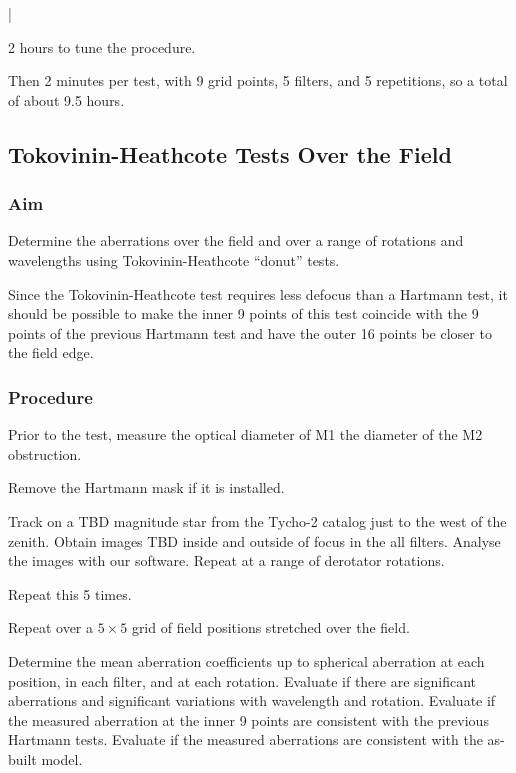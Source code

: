 |\documentclass{article}
\begin{document}
2 hours to tune the procedure.

Then 2 minutes per test, with 9 grid points, 5 filters, and 5 repetitions, so a total of about 9.5 hours.


\subsection{Tokovinin-Heathcote Tests Over the Field}

\subsubsection{Aim}

Determine the aberrations over the field and over a range of rotations and wavelengths using Tokovinin-Heathcote “donut” tests.

Since the Tokovinin-Heathcote test requires less defocus than a Hartmann test, it should be possible to make the inner 9 points of this test coincide with the 9 points of the previous Hartmann test and have the outer 16 points be closer to the field edge.

\subsubsection{Procedure}

Prior to the test, measure the optical diameter of M1 the diameter of the M2 obstruction.

Remove the Hartmann mask if it is installed.

Track on a TBD magnitude star from the Tycho-2 catalog just to the west of the zenith. Obtain images TBD inside and outside of focus in the all filters. Analyse the images with our software. Repeat at a range of derotator rotations.

Repeat this 5 times.

Repeat over a $5\times5$ grid of field positions stretched over the field.

Determine the mean aberration coefficients up to spherical aberration at each position, in each filter, and at each rotation. Evaluate if there are significant aberrations and significant variations with wavelength and rotation. Evaluate if the measured aberration at the inner 9 points are consistent with the previous Hartmann tests. Evaluate if the measured aberrations are consistent with the as-built model.
\end{document}
